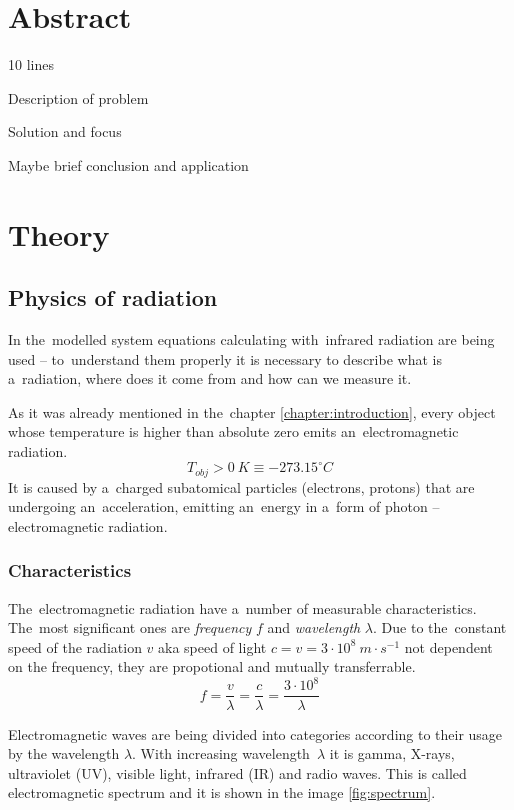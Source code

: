 \chapter{Abstract}
\label{abstract}

10 lines 

Description of problem

Solution and focus

Maybe brief conclusion and application







\chapter{Theory}
\label{theory}


\section{Physics of radiation}

In the~modelled system equations calculating with~infrared radiation are being used -- to~understand
them properly it is necessary to describe what is a~radiation, where does it come from and how can
we measure it. 

As it was already mentioned in the~chapter \ref{chapter:introduction}, every object whose temperature
is higher than absolute zero emits an~electromagnetic radiation.
$$T_{obj}>0~K\equiv -273.15^{\circ}C$$
It is caused by a~charged subatomical particles (electrons, protons) that are undergoing an~acceleration,
emitting an~energy in a~form of photon -- electromagnetic radiation.


\subsection*{Characteristics}
The~electromagnetic radiation have a~number of measurable characteristics. The~most significant ones
are {\it frequency} $f$ and {\it wavelength} $\lambda$. Due to the~constant speed of the radiation $v$
aka speed of light $c = v = 3\cdot10^{8}~m\cdot s^{-1}$ not dependent on the frequency, they are
propotional and mutually transferrable.
$$f=\frac{v}{\lambda}=\frac{c}{\lambda}=\frac{3\cdot10^{8}}{\lambda}$$

Electromagnetic waves are being divided into categories according to their usage by the wavelength
$\lambda$. With increasing wavelength~$\lambda$ it is gamma, X-rays, ultraviolet (UV), visible light,
infrared (IR) and radio waves. This is called electromagnetic spectrum and it is shown in the image
\ref{fig:spectrum}.

